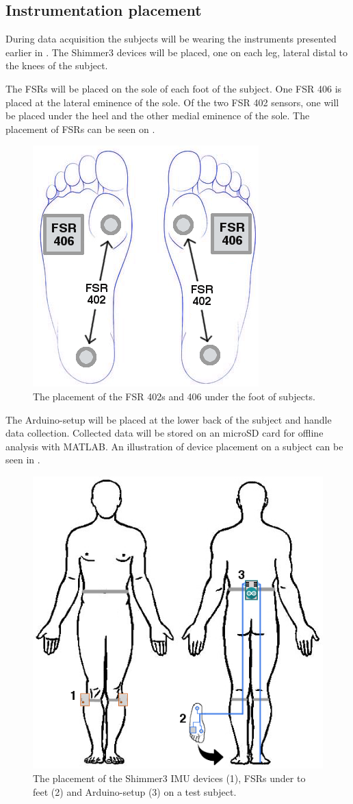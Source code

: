 \subsection{Instrumentation placement}

During data acquisition the subjects will be wearing the instruments presented earlier in . The Shimmer3 devices will be placed, one on each leg, lateral distal to the knees of the subject.

The FSRs will be placed on the sole of each foot of the subject. One FSR 406 is placed at the lateral eminence of the sole. Of the two FSR 402 sensors, one will be placed under the heel and the other medial eminence of the sole. The placement of FSRs can be seen on .

\begin{figure}[H]
	\includegraphics[width=.6\textwidth]{figures/humanSoleSensorPlacement}
	\caption{The placement of the FSR 402s and 406 under the foot of subjects.}
	\label{fig:soleSensorPlacement}  %
\end{figure}

The Arduino-setup will be placed at the lower back of the subject and handle data collection. Collected data will be stored on an microSD card for offline analysis with MATLAB. An illustration of device placement on a subject can be seen in .


\begin{figure}[H]
	\includegraphics[width=.6\textwidth]{figures/bodySysSetup}
	\caption{The placement of the Shimmer3 IMU devices (1), FSRs under to feet (2) and Arduino-setup (3) on a test subject.}
	\label{fig:bodySysSetup}  %
\end{figure}


